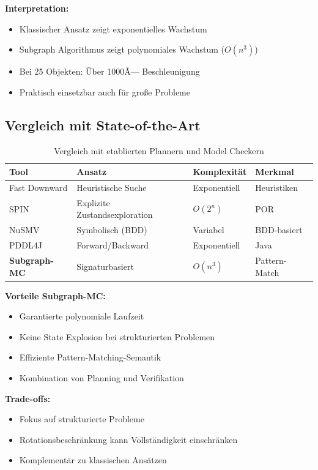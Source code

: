 ﻿\documentclass[a4paper,12pt]{article}
\theoremstyle{definition}
\begin{document}
\textbf{Interpretation:}
\begin{itemize}
	\item[-] Klassischer Ansatz zeigt exponentielles Wachstum
	\item[-] Subgraph Algorithmus zeigt polynomiales Wachstum ($O(n^3)$)
	\item[-] Bei 25 Objekten: Über 1000Ã— Beschleunigung
	\item[-] Praktisch einsetzbar auch für große Probleme
\end{itemize}

\subsection{Vergleich mit State-of-the-Art}

\begin{table}[h]
	\centering
	\caption{Vergleich mit etablierten Plannern und Model Checkern}
	\label{tab:sota_comparison}
	\begin{tabular}{lp{3.5cm}ll}
		\toprule
		Tool & Ansatz & Komplexi\-tät & Merkmal \\
		\midrule
		Fast Downward & Heuristische Suche & Exponentiell & Heuristiken \\
		SPIN & Explizite Zustands\-exploration & $O(2^n)$ & POR \\
		NuSMV & Symbolisch (BDD) & Variabel & BDD-basiert \\
		PDDL4J & Forward/Backward & Exponentiell & Java \\
		\textbf{Subgraph-MC} & Signaturbasiert & \textbf{$O(n^3)$} & Pattern-Match \\
		\bottomrule
	\end{tabular}
\end{table}

\textbf{Vorteile Subgraph-MC:}
\begin{itemize}
	\item[-] Garantierte polynomiale Laufzeit
	\item[-] Keine State Explosion bei strukturierten Problemen
	\item[-] Effiziente Pattern-Matching-Semantik
	\item[-] Kombination von Planning und Verifikation
\end{itemize}

\textbf{Trade-offs:}
\begin{itemize}
	\item[-] Fokus auf strukturierte Probleme
	\item[-] Rotationsbeschränkung kann Vollständigkeit einschränken
	\item[-] Komplementär zu klassischen Ansätzen
\end{itemize}
\end{document}
